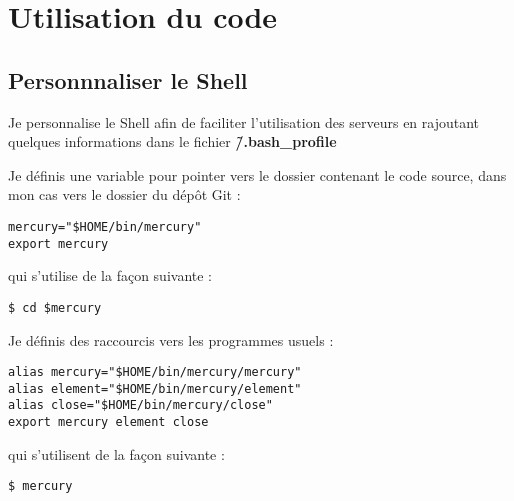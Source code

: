 \section{Utilisation du code}
\subsection{Personnnaliser le Shell}
Je personnalise le Shell afin de faciliter l'utilisation des serveurs en rajoutant quelques informations dans le fichier \textbf{\~/.bash\_profile}

Je définis une variable pour pointer vers le dossier contenant le code source, dans mon cas vers le dossier du dépôt Git : 
\begin{verbatim}
mercury="$HOME/bin/mercury"
export mercury
\end{verbatim}
qui s'utilise de la façon suivante : 
\begin{verbatim}
$ cd $mercury
\end{verbatim}

\bigskip

Je définis des raccourcis vers les programmes usuels : 
\begin{verbatim}
alias mercury="$HOME/bin/mercury/mercury"
alias element="$HOME/bin/mercury/element"
alias close="$HOME/bin/mercury/close"
export mercury element close
\end{verbatim}
qui s'utilisent de la façon suivante : 
\begin{verbatim}
$ mercury
\end{verbatim}

\bigskip

